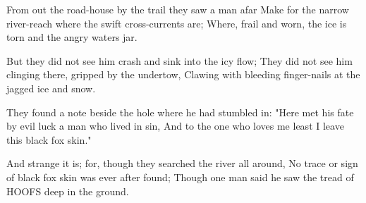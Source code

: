 \begin{poemblock}
 From out the road-house by the trail they saw a man afar
 Make for the narrow river-reach where the swift cross-currents are;
 Where, frail and worn, the ice is torn and the angry waters jar.

 But they did not see him crash and sink into the icy flow;
 They did not see him clinging there, gripped by the undertow,
 Clawing with bleeding finger-nails at the jagged ice and snow.

 They found a note beside the hole where he had stumbled in:
 "Here met his fate by evil luck a man who lived in sin,
 And to the one who loves me least I leave this black fox skin."

 And strange it is; for, though they searched the river all around,
 No trace or sign of black fox skin was ever after found;
 Though one man said he saw the tread of HOOFS deep in the ground.
\end{poemblock}
